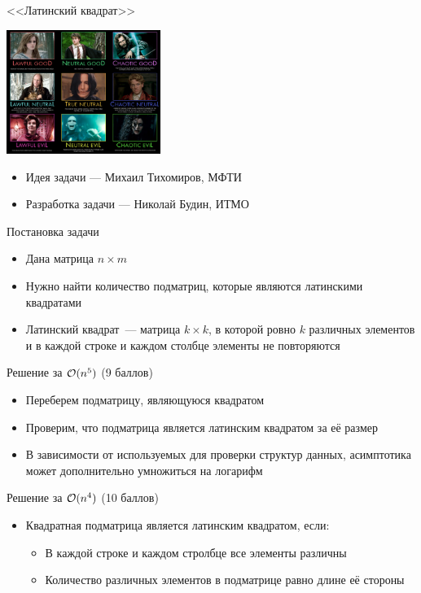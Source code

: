 \begin{frame}
  \begin{center}
    \LARGE <<Латинский квадрат>>
  \end{center}
  \begin{center}
      \includegraphics[width=5cm]{memes/h-meme.jpg}
  \end{center}
  \begin{itemize}
  \item Идея задачи --- Михаил Тихомиров, МФТИ
  \item Разработка задачи --- Николай Будин, ИТМО
  \end{itemize}
\end{frame}

\begin{frame}{Постановка задачи}

  \begin{itemize}
  \item Дана матрица $n \times m$
  \item Нужно найти количество подматриц, которые являются латинскими квадратами
  \item Латинский квадрат~--- матрица $k \times k$, в которой ровно $k$ различных элементов и в каждой строке и каждом столбце элементы не повторяются
  \end{itemize}
  
\end{frame}

\begin{frame}{Решение за $\mathcal{O}(n ^ 5)$ (9 баллов)}
  \begin{itemize}
  \item Переберем подматрицу, являющуюся квадратом
  \item Проверим, что подматрица является латинским квадратом за её размер
  \item В зависимости от используемых для проверки структур данных, асимптотика может дополнительно умножиться на логарифм
  \end{itemize}
\end{frame}

\begin{frame}{Решение за $\mathcal{O}(n ^ 4)$ (10 баллов)}
  \begin{itemize}
  \item Квадратная подматрица является латинским квадратом, если:
  \begin{itemize}
  \item В каждой строке и каждом стролбце все элементы различны
  \item Количество различных элементов в подматрице равно длине её стороны
  \end{itemize}
  \end{itemize}
\end{frame}

